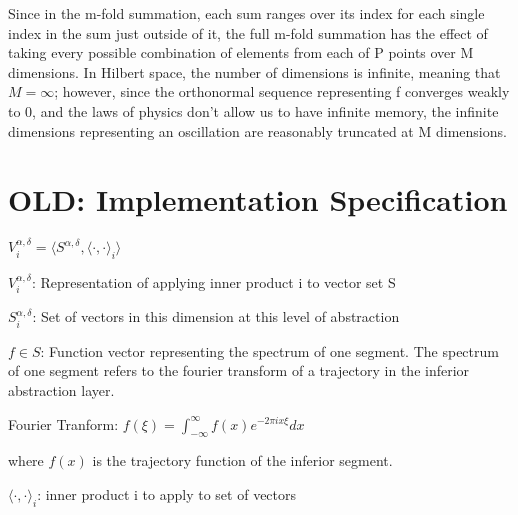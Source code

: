 \documentclass{MastersDoctoralThesis}
\begin{document}
Since in the m-fold summation, each sum ranges over its index for each single index in the sum just outside of it, the full m-fold summation has the effect of taking every possible combination of elements from each of P points over M dimensions.  In Hilbert space, the number of dimensions is infinite, meaning that $M = \infty$; however, since the orthonormal sequence representing f converges weakly to 0, and the laws of physics don't allow us to have infinite memory, the infinite dimensions representing an oscillation are reasonably truncated at M dimensions.

\section{OLD: Implementation Specification}

$V_i^{\alpha , \delta} = \langle S^{\alpha, \delta}, \langle \cdot , \cdot \rangle_i \rangle$

$V_i^{\alpha , \delta}$: Representation of applying inner product i to vector set S

$S_i^{\alpha , \delta}$: Set of vectors in this dimension at this level of abstraction

$f \in S$: Function vector representing the spectrum of one segment.
The spectrum of one segment refers to the fourier transform of a trajectory in the inferior abstraction layer.

Fourier Tranform: $f(\xi) = \int_{-\infty}^\infty f(x) e^{-2 \pi i x \xi} dx$

where $f(x)$ is the trajectory function of the inferior segment.

$\langle \cdot , \cdot \rangle_i$: inner product i to apply to set of vectors
\end{document}
